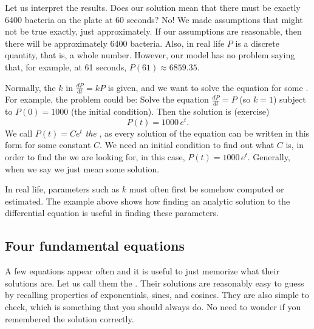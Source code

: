 \begin{example}


Let us interpret the results.  Does our solution
mean that
there must be exactly 6400 bacteria on the plate at 60 seconds?  No!  We made
assumptions that might not be true exactly, just approximately.
If our assumptions are reasonable,
then there will be approximately 6400 bacteria.
Also, in real life $P$ is a
discrete quantity, that is, a whole number.  However, our model has no problem saying
that, for example, at 61 seconds, $P(61) \approx 6859.35$.
\end{example}

Normally, the $k$ in $\frac{dP}{dt} = kP$ is given,
and we want to solve
the equation for some \emph{}.
For example, the problem could be:
Solve the equation
$\frac{dP}{dt} = P$ (so $k=1$)
subject to $P(0) = 1000$ (the initial condition).
Then the solution is (exercise)
\begin{equation*}
P(t) = 1000 \, e^t .
\end{equation*}
We call $P(t) = C e^t$ \emph{the },
as every solution
of the equation can be written in this form for some constant $C$.  We
need an initial condition to find out what $C$ is, in order to find the
\emph{} we are looking for,
in this case, $P(t) = 1000\, e^t$.
Generally, when we say
 we just mean some solution.

In real life, parameters such as $k$
must often first be somehow computed or estimated.  The example above
shows how finding an analytic solution to the differential equation
is useful in finding these parameters.

\subsection{Four fundamental equations} \label{subsection:fourfundamental}

A few equations appear often and
it is useful to just memorize what
their solutions are.
Let us call them the .
Their solutions
are reasonably easy
to guess by recalling properties of exponentials, sines, and cosines.
They are also simple to check, which is something that you should always do.
No need to wonder if you remembered the solution correctly.

